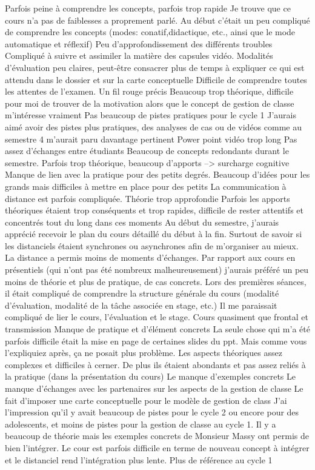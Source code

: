 \documentclass[
  french,
]{article}
\begin{document}
Parfois peine à comprendre les concepts, parfois trop rapide
Je trouve que ce cours n'a pas de faiblesses a proprement parlé.
Au début c'était un peu compliqué de comprendre les concepts (modes: conatif,didactique, etc., ainsi que le mode automatique et réflexif)
Peu d'approfondissement des différents troubles
Compliqué à suivre et assimiler la matière des capsules vidéo.
Modalités d'évaluation peu claires, peut-être consacrer plus de temps à expliquer ce qui est attendu dans le dossier et sur la carte conceptuelle
Difficile de comprendre toutes les attentes de l'examen.
Un fil rouge précis
Beaucoup trop théorique, difficile pour moi de trouver de la motivation alors que le concept de gestion de classe m'intéresse vraiment
Pas beaucoup de pistes pratiques pour le cycle 1
J'aurais aimé avoir des pistes plus pratiques, des analyses de cas ou de vidéos comme au semestre 4 m'aurait paru davantage pertinent
Power point vidéo trop long
Pas assez d'échanges entre étudiants
Beaucoup de concepts redondants durant le semestre.
Parfois trop théorique, beaucoup d'apports --\textgreater{} surcharge cognitive
Manque de lien avec la pratique pour des petits degrés. Beaucoup d'idées pour les grands mais difficiles à mettre en place pour des petits
La communication à distance est parfois compliquée.
Théorie trop approfondie
Parfois les apports théoriques étaient trop conséquents et trop rapides, difficile de rester attentifs et concentrés tout du long dans ces moments
Au début du semestre, j'aurais apprécié recevoir le plan du cours détaillé du début à la fin. Surtout de savoir si les distanciels étaient synchrones ou asynchrones afin de m'organiser au mieux.
La distance a permis moins de moments d'échanges.
Par rapport aux cours en présentiels (qui n'ont pas été nombreux malheureusement) j'aurais préféré un peu moins de théorie et plus de pratique, de cas concrets.
Lors des premières séances, il était compliqué de comprendre la structure générale du cours (modalité d'évaluation, modalité de la tâche associée en stage, etc.) Il me paraissait compliqué de lier le cours, l'évaluation et le stage.
Cours quasiment que frontal et transmission
Manque de pratique et d'élément concrets
La seule chose qui m'a été parfois difficile était la mise en page de certaines slides du ppt. Mais comme vous l'expliquiez après, ça ne posait plus problème.
Les aspects théoriques assez complexes et difficiles à cerner. De plus ils étaient abondants et pas assez reliés à la pratique (dans la présentation du cours)
Le manque d'exemples concrets
Le manque d'échanges avec les partenaires sur les aspects de la gestion de classe
Le fait d'imposer une carte conceptuelle pour le modèle de gestion de class
J'ai l'impression qu'il y avait beaucoup de pistes pour le cycle 2 ou encore pour des adolescents, et moins de pistes pour la gestion de classe au cycle 1.
Il y a beaucoup de théorie mais les exemples concrets de Monsieur Massy ont permis de bien l'intégrer.
Le cour est parfois difficile en terme de nouveau concept à intégrer et le distanciel rend l'intégration plus lente.
Plus de référence au cycle 1
\end{document}

